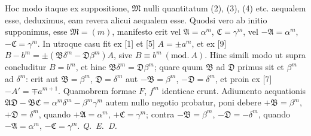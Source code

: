 Hoc modo itaque ex suppositione, $\mathfrak{M}$ nulli quantitatum (2), (3), (4) etc. aequalem esse, deduximus, eam revera alicui aequalem esse. Quodsi vero ab
initio supponimus, esse $\mathfrak{M}=(m)$, manifesto erit vel $\mathfrak{A}=\alpha^m$, $\mathfrak{C}=\gamma^m$, vel $-\mathfrak{A}=\alpha^m$, $-\mathfrak{C}=\gamma^m$. In utroque casu fit ex [1] et [5] $A=\pm a^m$, et ex [9] $B-b^m=\pm(\mathfrak{B}\delta^m-\mathfrak{D}\beta^m)A$, sive $B\equiv b^m\ (\mathrm{mod.}\ A)$. Hinc simili modo ut supra concluditur $B=b^m$, et hinc $\mathfrak{B}\delta^m=\mathfrak{D}\beta^m$; quare quum $\mathfrak{B}$ ad $\mathfrak{D}$ primus sit et $\beta^m$ ad $\delta^m$: erit aut $\mathfrak{B}=\beta^m$, $\mathfrak{D}=\delta^m$ aut $-\mathfrak{B}=\beta^m$, $-\mathfrak{D}=\delta^m$, et proin ex [7] $-A'=\mp a^{m+1}$. Quamobrem formae $F$, $f^m$ identicae erunt. Adiumento aequationis $\mathfrak{A}\mathfrak{D}-\mathfrak{B}\mathfrak{C}=\alpha^m\delta^m-\beta^m\gamma^m$ autem nullo negotio probatur, poni debere $+\mathfrak{B}=\beta^m$, $+\mathfrak{D}=\delta^m$, quando $+\mathfrak{A}=\alpha^m$, $+\mathfrak{C}=\gamma^m$; contra $-\mathfrak{B}=\beta^m$, ${-\mathfrak{D}=-\delta^m}$, quando $-\mathfrak{A}=\alpha^m$, $-\mathfrak{C}=\gamma^m$. \textit{Q. E. D.}

